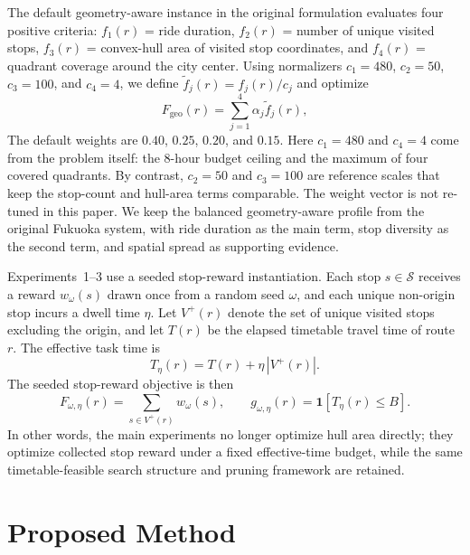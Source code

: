 The default geometry-aware instance in the original formulation evaluates four
positive criteria:
\(f_1(r)\) = ride duration,
\(f_2(r)\) = number of unique visited stops,
\(f_3(r)\) = convex-hull area of visited stop coordinates, and
\(f_4(r)\) = quadrant coverage around the city center.
Using normalizers \(c_1=480\), \(c_2=50\), \(c_3=100\), and \(c_4=4\), we define
\(\tilde{f}_j(r)=f_j(r)/c_j\) and optimize
\begin{equation}
    \label{eq:objective_geometry}
    F_{\mathrm{geo}}(r) = \sum_{j=1}^{4} \alpha_j \tilde{f}_j(r),
\end{equation}
The default weights are \(0.40\), \(0.25\), \(0.20\), and \(0.15\).
Here \(c_1=480\) and \(c_4=4\) come from the problem itself:
the 8-hour budget ceiling and the maximum of four covered quadrants.
By contrast, \(c_2=50\) and \(c_3=100\) are reference scales that keep the
stop-count and hull-area terms comparable.
The weight vector is not re-tuned in this paper.
We keep the balanced geometry-aware profile from the original Fukuoka system,
with ride duration as the main term, stop diversity as the second term,
and spatial spread as supporting evidence.

Experiments~1--3 use a seeded stop-reward instantiation. Each stop
\(s \in \mathcal{S}\) receives a reward \(w_{\omega}(s)\) drawn once from a
random seed \(\omega\), and each unique non-origin stop incurs a dwell time
\(\eta\). Let \(V^{+}(r)\) denote the set of unique visited stops excluding the
origin, and let \(T(r)\) be the elapsed timetable travel time of route \(r\).
The effective task time is
\begin{equation}
    \label{eq:effective_time}
    T_{\eta}(r) = T(r) + \eta \, |V^{+}(r)|.
\end{equation}
The seeded stop-reward objective is then
\begin{equation}
    \label{eq:objective_stop_reward}
    F_{\omega,\eta}(r) = \sum_{s \in V^{+}(r)} w_{\omega}(s),
    \qquad
    g_{\omega,\eta}(r)=\mathbf{1}\!\left[T_{\eta}(r)\le B\right].
\end{equation}
In other words, the main experiments no longer optimize hull area directly;
they optimize collected stop reward under a fixed effective-time budget, while
the same timetable-feasible search structure and pruning framework are retained.

\section{Proposed Method}
